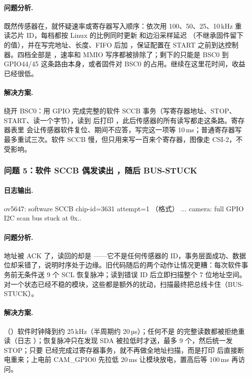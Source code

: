 \paragraph{问题分析.} 既然传感器在，就怀疑速率或寄存器写入顺序：依次用 100、50、25、10\,kHz 重读芯片 ID，每档都按 Linux 的比例同时更新  和边沿采样延迟 （不继承固件留下的值），并在写完地址、长度、FIFO 后加 ，保证配置在 START 之前到达控制器。四档全部是 ，速率和 MMIO 写序都被排除了；剩下的只能是 BSC0 到 GPIO44/45 这条路由本身，或者固件对 BSC0 的占用。继续在这里花时间，收益已经很低。

\paragraph{解决方案.} 绕开 BSC0：用 GPIO 完成完整的软件 SCCB 事务（写寄存器地址、STOP、START、读一个字节），读到  后打印 ，此后传感器的所有读写都走这条路。寄存器表里  会让传感器软件复位、期间不应答，写完这一项等 10\,ms；普通寄存器写最多重试三次。软件 SCCB 慢，但只用来写一百来个寄存器，图像走 CSI-2，不受影响。

\subsubsection{问题 5：软件 SCCB 偶发读出 ，随后 BUS-STUCK}

\paragraph{日志输出.}
\begin{txtcode}
ov5647: software SCCB chip-id=3631 attempt=1                   （格式）
...
camera: full GPIO I2C scan bus stuck at 0x..
\end{txtcode}

\paragraph{问题分析.} 地址被 ACK 了，读回的却是 ——它不是任何传感器的 ID，事务层面成功、数据位却采错了，说明时序处于边缘。旧代码随后的两个动作让情况更糟：每次软件事务前无条件送 9 个 SCL 恢复脉冲；读到错误 ID 后立即扫描整个 7 位地址空间。对一个状态已经不稳的模块，这些都是额外的扰动，扫描最终把总线卡住（BUS-STUCK）。

\paragraph{解决方案.}（）软件时钟降到约 25\,kHz（半周期约 20\,µs）；任何不是  的完整读数都被拒绝重读（日志 ）；恢复脉冲只在发现 SDA 被拉低时才送，最多 9 个，然后统一发 STOP；只要  已经完成过寄存器事务，就不再做全地址扫描，而是打印  后直接断电重来；上电前 CAM\_GPIO0 先拉低 20\,ms 让模块放电，置高后等 100\,ms 再访问。

